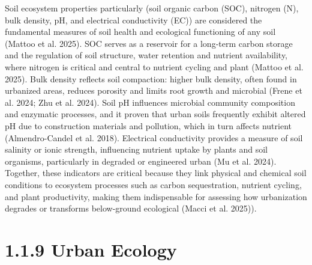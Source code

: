 Soil ecosystem properties particularly (soil organic carbon (SOC), nitrogen (N), bulk density, pH, and electrical conductivity (EC)) are considered the fundamental measures of soil health and ecological functioning of any soil (Mattoo et al. 2025). SOC serves as a reservoir for a long-term carbon storage and the regulation of soil structure, water retention and nutrient availability, where nitrogen is critical and central to nutrient cycling and plant (Mattoo et al. 2025). Bulk density reflects soil compaction: higher bulk density, often found in urbanized areas, reduces porosity and limits root growth and microbial (Frene et al. 2024; Zhu et al. 2024). Soil pH influences microbial community composition and enzymatic processes, and it proven that urban soils frequently exhibit altered pH due to construction materials and pollution, which in turn affects nutrient (Almendro-Candel et al. 2018). Electrical conductivity provides a measure of soil salinity or ionic strength, influencing nutrient uptake by plants and soil organisms, particularly in degraded or engineered urban (Mu et al. 2024). Together, these indicators are critical because they link physical and chemical soil conditions to ecosystem processes such as carbon sequestration, nutrient cycling, and plant productivity, making them indispensable for assessing how urbanization degrades or transforms below-ground ecological (Macci et al. 2025)).
\hypertarget{urban-ecology}{%
\section{\texorpdfstring{\textbf{1.1.9 Urban Ecology}}{1.1.9 Urban Ecology}}\label{urban-ecology}}

